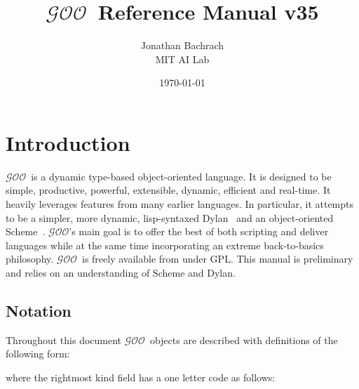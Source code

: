 \documentclass[twoside,twocolumn,9pt]{extarticle}
\newcommand{\goo}{$\mathcal{GOO}$}
\begin{document}
\label{top_node}

\T\sloppy    %

\title{{\Huge \goo\ Reference Manual v35 } %
}
\author{{\huge Jonathan Bachrach} \\
        {\Large MIT AI Lab}
}
\date{\today}


\maketitle

\section{Introduction}

\goo\ is a dynamic type-based object-oriented language.  It is
designed to be simple, productive, powerful, extensible, dynamic,
efficient and real-time.  It heavily leverages features from many
earlier languages.  In particular, it attempts to be a simpler,
more dynamic, lisp-syntaxed Dylan~\cite{Shalit:1996} and an object-oriented 
Scheme~\cite{Kelsey:Clinger:Rees:hosc:1998}.
\goo's main goal is to offer the best of both scripting and
deliver languages while at the same time 
incorporating an extreme back-to-basics philosophy.
\goo\ is freely available from  under GPL.
This manual is preliminary and relies on an understanding
of Scheme and Dylan.

\subsection{Notation}

Throughout this document \goo\ objects are described with definitions
of the following form:

\begin{defs}
\end{defs}

where the rightmost kind field has a one letter code as follows:

\begin{defs}
\end{defs}
\end{document}
